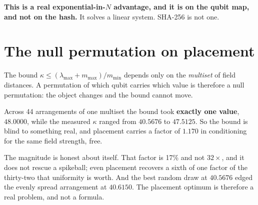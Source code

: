 \textbf{This is a real exponential-in-\(N\) advantage, and it is on the qubit map, and not on the hash.}
It solves a linear system. SHA-256 is not one.

\section{The null permutation on placement}

The bound \(\kappa \le (\lambda_{\max} + m_{\max})/m_{\min}\) depends only on the \emph{multiset} of
field distances. A permutation of which qubit carries which value is therefore a null permutation: the object
changes and the bound cannot move.

Across 44 arrangements of one multiset the bound took \textbf{exactly one value}, \(48.0000\), while
the measured \(\kappa\) ranged from \(40.5676\) to \(47.5125\). So the bound is blind to something
real, and placement carries a factor of \(1.170\) in conditioning for the same field strength, free.

The magnitude is honest about itself. That factor is 17\% and not \(32\times\), and it does not rescue
a spikeball; even placement recovers a sixth of one factor of the thirty-two that uniformity is
worth. And the best random draw at \(40.5676\) edged the evenly spread arrangement at \(40.6150\). The
placement optimum is therefore a real problem, and not a formula.
